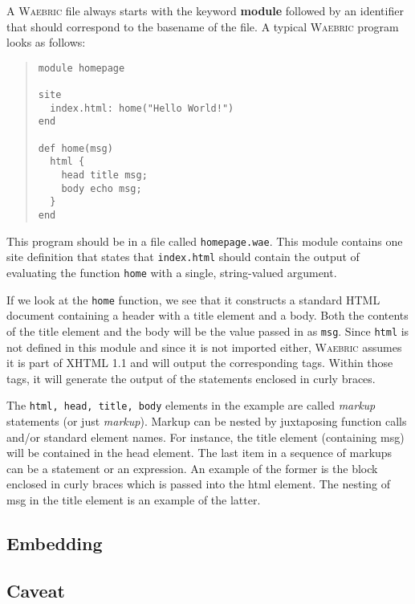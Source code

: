 \documentclass[a4paper]{article}
\def\waebric{\textsc{Waebric}\xspace}
\begin{document}
A \waebric file always starts with the keyword \textbf{module}
followed by an identifier that should correspond to the basename of
the file. A typical  \waebric program looks as follows:
\begin{quote}
\begin{lstlisting}[language=waebric]
module homepage

site 
  index.html: home("Hello World!")
end

def home(msg)
  html {
    head title msg;
    body echo msg;
  }
end
\end{lstlisting}
\end{quote}
This program should be in a file called \texttt{homepage.wae}. This
module contains one site definition that states that
\texttt{index.html} should contain the output of evaluating the
function \texttt{home} with a single, string-valued argument.

If we look at the \texttt{home} function, we see that it constructs a
standard HTML document containing a header with a title element and a
body. Both the contents of the title element and the body will be the
value passed in as \texttt{msg}. Since \texttt{html} is not defined in
this module and since it is not imported either, \waebric assumes it
is part of XHTML 1.1 and will output the corresponding tags. Within
those tags, it will generate the output of the statements enclosed in
curly braces. 

The \texttt{html, head, title, body} elements in the example are
called \textit{markup} statements (or just \textit{markup}). Markup
can be nested by juxtaposing function calls and/or standard element
names. For instance, the title element (containing msg) will be
contained in the head element. The last item in a sequence of markups
can be a statement or an expression. An example of the former is the
block enclosed in curly braces which is passed into the html
element. The nesting of msg in the title element is an example of the
latter.

\subsection{Embedding}


\subsection{Caveat}
\end{document}
